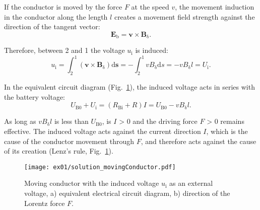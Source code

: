 \begin{solutionblock}
    If the conductor is moved by the force $F$ at the speed $v$, the movement induction in the conductor along the length $l$ creates a movement field strength against the direction of the tangent vector:
    \begin{equation}
        \boldsymbol{E}_{\mathrm{b}} = \boldsymbol{v} \times \boldsymbol{B}_{\mathrm{\updelta}}.
    \end{equation}
    
    Therefore, between 2 and 1 the voltage $u_{\mathrm{i}}$ is induced:
    \begin{equation}
        u_{\mathrm{i}}
        = \int_{2}^{1} (\boldsymbol{v} \times \boldsymbol{B}_{\updelta}) \mathrm{d}\boldsymbol{s}
        = - \int_{2}^{1} v B_{\updelta} \mathrm{d}s
        = -v B_{\updelta} l
        = U_{\mathrm{i}}.
    \end{equation}

    In the equivalent circuit diagram (Fig.~\ref{fig:solution_movingConductor}), the induced voltage acts in series with the battery voltage:
    \begin{equation}
        U_{\mathrm{B0}} + U_{\mathrm{i}} = (R_{\mathrm{Bi}} + R) I
        = U_{\mathrm{B0}} - v B_{\updelta} l.
    \end{equation}

    As long as $v B_{\updelta} l$ is less than $U_{\mathrm{B0}}$, is $I$ > 0 and the driving force $F$ > 0 remains effective. The induced voltage acts against the current direction $I$, which is the cause of the conductor movement through $F$, and therefore acts against the cause of its creation (Lenz's rule, Fig.~\ref{fig:solution_movingConductor}).

    \begin{figure}[ht]
        \centering
        \texttt{[image: ex01/solution\_movingConductor.pdf]}
        \caption{Moving conductor with the induced voltage $u_{\mathrm{i}}$ as an external voltage, a) equivalent electrical circuit diagram, b) direction of the Lorentz force $F$.}
        \label{fig:solution_movingConductor}
    \end{figure}

\end{solutionblock}





